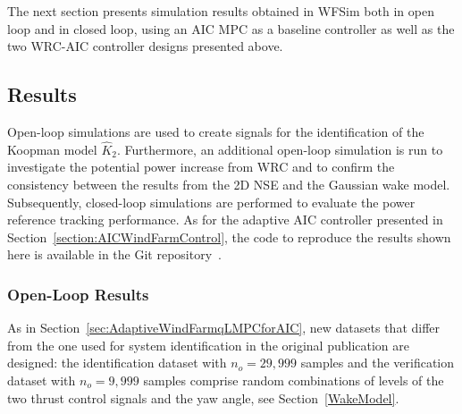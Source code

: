 The next section presents simulation results obtained in WFSim both in open loop and in closed loop, using an AIC MPC as a baseline controller as well as the two WRC-AIC controller designs presented above.


\subsection{Results} \label{SimResults}
Open-loop simulations are used to create signals for the identification of the Koopman model $\hat{K}_2$. Furthermore, an additional open-loop simulation is run to investigate the potential power increase from WRC and to confirm the consistency between the results from the 2D NSE and the Gaussian wake model. Subsequently, closed-loop simulations are performed to evaluate the power reference tracking performance. As for the adaptive AIC controller presented in Section~\ref{section:AICWindFarmControl}, the code to reproduce the results shown here is available in the Git repository~\cite{GitRepoCodeWF}. %


\subsubsection{Open-Loop Results}
As in Section~\ref{sec:AdaptiveWindFarmqLMPCforAIC}, new datasets that differ from the one used for system identification in the original publication \cite{dittmer2023koopman} are designed: the identification dataset with $n_o = 29{,}999$ samples and the verification dataset with $n_o = 9{,}999$ samples comprise random combinations of levels of the two thrust control signals and the yaw angle, see Section~\ref{WakeModel}.

